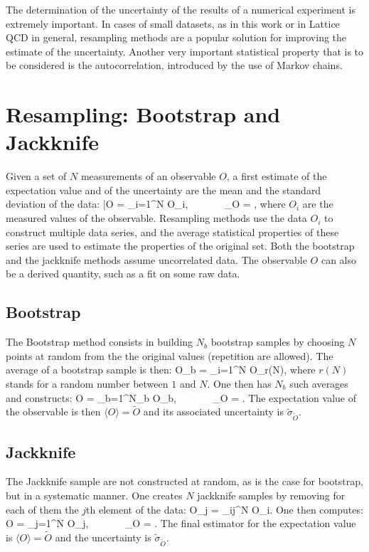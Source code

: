 The determination of the uncertainty of the results of a numerical experiment is extremely important. In cases of small datasets, as in this work or in Lattice QCD in general, resampling methods are a popular solution for improving the estimate of the uncertainty. Another very important statistical property that is to be considered is the autocorrelation, introduced by the use of Markov chains.

\section{Resampling: Bootstrap and Jackknife}
Given a set of $N$ measurements of an observable $O$, a first estimate of the expectation value and of the uncertainty are the mean and the standard deviation of the data:
\beq
    \bar O = \sum_{i=1}^N O_i, ~~~~~~ \sigma_O = ,
\eeq
where $O_i$ are the measured values of the observable. Resampling methods use the data $O_i$ to construct multiple data series, and the average statistical properties of these series are used to estimate the properties of the original set. Both the bootstrap and the jackknife methods assume uncorrelated data. The observable $O$ can also be a derived quantity, such as a fit on some raw data.

\subsection{Bootstrap}
\label{app:resampling}
The Bootstrap method consists in building $N_b$ bootstrap samples by choosing $N$ points at random from the the original values (repetition are allowed). The average of a bootstrap sample is then:
\beq
    \hat O_b = \sum_{i=1}^N O_{r(N)},
\eeq
where $r(N)$ stands for a random number between $1$ and $N$. One then has $N_b$ such averages and constructs:
\beq
    \tilde O = \sum_{b=1}^{N_b} \hat O_b, ~~~~~~ \tilde\sigma_{\tilde O} = .
\eeq
The expectation value of the observable is then $\langle O \rangle = \tilde O$ and its associated uncertainty is $\tilde\sigma_{\tilde O}$.

\subsection{Jackknife}
The Jackknife sample are not constructed at random, as is the case for bootstrap, but in a systematic manner. One creates $N$ jackknife samples by removing for each of them the $j$th element of the data:
\beq
\hat O_j = \sum_{i\neq j}^N O_i.
\eeq
One then computes:
\beq
\tilde O = \sum_{j=1}^{N} \hat O_j, ~~~~~~ \tilde\sigma_{\tilde O} = .
\eeq
The final estimator for the expectation value is  $\langle O \rangle = \tilde O$ and the uncertainty is $\tilde\sigma_{\tilde O}$.\\

